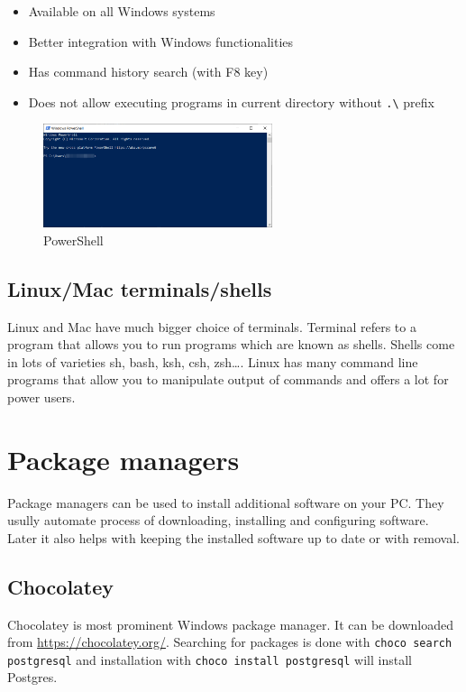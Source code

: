 \documentclass[lang=en,color=green]{elegantbook}
\begin{document}
\noindent\begin{minipage}[t]{0.5\textwidth}%
    \begin{itemize}[leftmargin=*]
        \item Available on all Windows systems
        \item Better integration with Windows functionalities
        \item Has command history search (with F8 key)
    \end{itemize}
\end{minipage}%
\begin{minipage}[t]{0.5\textwidth}%
    \begin{itemize}[leftmargin=*]
        \item  Does not allow executing programs in 
        current directory without  \lstinline{.\} prefix
    \end{itemize}
\end{minipage}%

\begin{figure}[htbp]
    \centering
    \includegraphics[width=0.6\textwidth]{images/powershell.png}
    \caption{PowerShell\label{fig:PowerShell}}
\end{figure}

\subsection{Linux/Mac terminals/shells}

Linux and Mac have much bigger choice of terminals. Terminal refers to a program that allows you to run
programs which are known as shells. Shells come in lots of varieties sh, bash, ksh, csh, zsh\dots. 
Linux has many command line programs that allow you to manipulate output of commands and 
offers a lot for power users.


\section{Package managers} 

Package managers can be used to install additional software on your PC. They usully automate process of 
downloading, installing and configuring software. Later it also helps with keeping the installed software 
up to date or with removal. 

\subsection{Chocolatey}

Chocolatey is most prominent Windows package manager. It can be downloaded from \href{https://chocolatey.org/}{https://chocolatey.org/}.
Searching for packages is done with \texttt{choco search postgresql} 
and installation with \texttt{choco install postgresql} will install Postgres.
\end{document}
